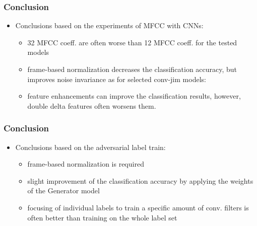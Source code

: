 \begin{frame}
  \frametitle{Conclusion}
  \begin{itemize}
    \item Conclusions based on the experiments of MFCC with CNNs:
    \begin{itemize}
      \item 32 MFCC coeff. are often worse than 12 MFCC coeff. for the tested models
      \item frame-based normalization decreases the classification accuracy, but improves noise invariance as for selected conv-jim models:
      \vspace{-0.5cm}
      \begin{figure}[!ht]
        \centering
        \qquad
      \end{figure}
      \item feature enhancements can improve the classification results, however, double delta features often worsens them.
    \end{itemize}
  \end{itemize}
\end{frame}

\begin{frame}
  \frametitle{Conclusion}
  \begin{itemize}
  \item Conclusions based on the adversarial label train:
    \begin{itemize}
      \item frame-based normalization is required
      \item slight improvement of the classification accuracy by applying the weights of the Generator model
      \item focusing of individual labels to train a specific amount of conv. filters is often better than training on the whole label set
    \end{itemize}
  \end{itemize}
\end{frame}